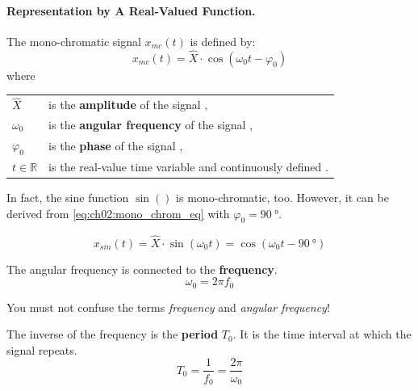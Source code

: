 \begin{refsection}
\paragraph{Representation by A Real-Valued Function.}

The mono-chromatic signal $x_{mc}(t)$ is defined by:
\begin{equation}
	x_{mc}(t) = \hat{X} \cdot \cos\left(\omega_0 t - \varphi_0\right)
	\label{eq:ch02:mono_chrom_eq}
\end{equation}%
%
where

\begin{tabular}{ll}
	$\hat{X}$ & is the \index{amplitude} \textbf{amplitude} of the signal \nomenclature[Sx]{$\hat{X}$}{Amplitude of a mono-chromatic signal}, \\
	$\omega_0$ & is the \index{angular frequency} \textbf{angular frequency} of the signal \nomenclature[So]{$\omega_0$}{Angular frequency of a mono-chromatic signal}, \\
	$\varphi_0$ & is the \index{phase} \textbf{phase} of the signal \nomenclature[Sp]{$\varphi_0$}{Phase of a mono-chromatic signal}, \\
	$t \in \mathbb{R}$ & is the real-value time variable and continuously defined \nomenclature[St]{$t$}{Time (continuous)}.
\end{tabular}

In fact, the sine function $\sin()$ is mono-chromatic, too. However, it can be derived from \eqref{eq:ch02:mono_chrom_eq} with $\varphi_0 = \SI{90}{\degree}$.

\begin{equation*}
	x_{sin}(t) = \hat{X} \cdot \sin\left(\omega_0 t\right) = \cos\left(\omega_0 t - \SI{90}{\degree}\right)
\end{equation*}

The angular frequency is connected to the  \textbf{frequency}.
\begin{equation}
	\omega_0 = 2 \pi f_0
\end{equation}%

\begin{attention}
	You must not confuse the terms \emph{frequency} and \emph{angular frequency}!
\end{attention}

The inverse of the frequency is the  \textbf{period} $T_0$. It is the time interval at which the signal repeats.
\begin{equation}
	T_0 = \frac{1}{f_0} = \frac{2 \pi}{\omega_0}
\end{equation}%


\end{refsection}
